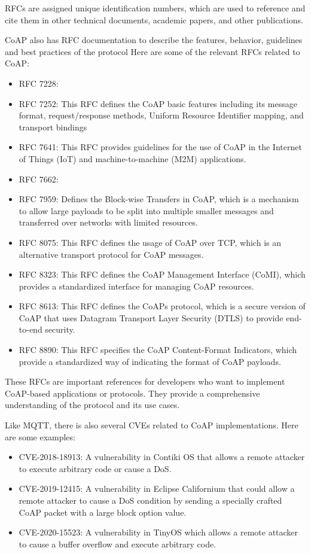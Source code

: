 \acs{RFC}s are assigned unique identification numbers, which are used to reference and cite them in other technical documents, academic papers, and other publications.

\acs{CoAP} also has \acs{RFC} documentation to describe the features, behavior, guidelines and best practices of the protocol
Here are some of the relevant \acs{RFC}s related to \acs{CoAP}:

\begin{itemize}
    \item \acs{RFC} 7228: 
    \item \acs{RFC} 7252: This RFC defines the \acs{CoAP} basic features including its message format, request/response methods, Uniform Resource Identifier mapping, and transport bindings
    \item \acs{RFC} 7641: This RFC provides guidelines for the use of CoAP in the Internet of Things (IoT) and machine-to-machine (M2M) applications.
    \item \acs{RFC} 7662:
    \item \acs{RFC} 7959: Defines the Block-wise Transfers in \acs{CoAP}, which is a mechanism to allow large payloads to be split into multiple smaller messages and transferred over networks with limited resources.
    \item \acs{RFC} 8075: This RFC defines the usage of CoAP over TCP, which is an alternative transport protocol for CoAP messages.
    \item \acs{RFC} 8323: This RFC defines the CoAP Management Interface (CoMI), which provides a standardized interface for managing CoAP resources.
    \item \acs{RFC} 8613: This RFC defines the CoAPs protocol, which is a secure version of CoAP that uses Datagram Transport Layer Security (DTLS) to provide end-to-end security.
    \item \acs{RFC} 8890: This RFC specifies the CoAP Content-Format Indicators, which provide a standardized way of indicating the format of CoAP payloads.
\end{itemize}
These \acs{RFC}s are important references for developers who want to implement CoAP-based applications or protocols. They provide a comprehensive understanding of the protocol and its use cases.

Like \acs{MQTT}, there is also several \acs{CVE}s related to \acs{CoAP} implementations. Here are some examples:
\begin{itemize}
    \item CVE-2018-18913: A vulnerability in Contiki OS that allows a remote attacker to execute arbitrary code or cause a \ac{DoS}.
    \item CVE-2019-12415: A vulnerability in Eclipse Californium that could allow a remote attacker to cause a \ac{DoS} condition by sending a specially crafted \acs{CoAP} packet with a large block option value.
    \item CVE-2020-15523: A vulnerability in TinyOS which allows a remote attacker to cause a buffer overflow and execute arbitrary code.
\end{itemize}


